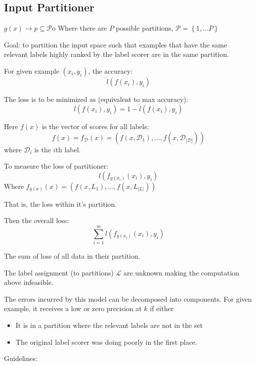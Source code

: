 \subsection{Input Partitioner}
$g(x) \rightarrow p \subseteq \mathcal{P}$o
Where there are $P$ possible partitions, $\mathcal{P} = \left\{ 1, \dots P
\right\}$

Goal: to partition the input space such that examples that have the same
relevant labels highly ranked by the label scorer are in the same
partition.

For given example $(x_i, y_i)$, the accuracy:
\[\hat{l}(f(x_i), y_i)\]

The loss is to be minimized as (equivalent to max accuracy):
\begin{equation}
    l(f(x_i), y_i) = 1- \hat{l}(f(x_i), y_i)
\end{equation}

Here $f(x)$ is the vector of scores for all labels:
\[ f(x) = f_{\mathcal{D}}(x) = \left( f(x, \mathcal{D}_1), \dots,
f(x, \mathcal{D}_{|\mathcal{D}|}) \right)\]
where $\mathcal{D}_i$ is the $i$th label.

To measure the loss of partitioner:
\begin{equation}
    l(f_{g(x_i)}(x_i), y_i)
\end{equation}
Where $f_{g(x)}(x) = \left( f(x, L_1), \dots, f(x, L_{|L|}) \right)$

That is, the loss within it's partition.

Then the overall loss:
\begin{equation}
    \sum_{i=1}^m l(f_{g(x_i)}(x_i), y_i)
\end{equation}

The sum of loss of all data in their partition.

The label assignment (to partitions) $\mathcal{L}$ are unknown making the
computation above infeasible. 

The errors incurred by this model can be decomposed into components. For
given example, it receives a low or zero precision at $k$ if either

\begin{itemize}
    \item It is in a partition where the relevant labels are not in the
        set
    \item The original label scorer was doing poorly in the first place.
\end{itemize}

Guidelines:

